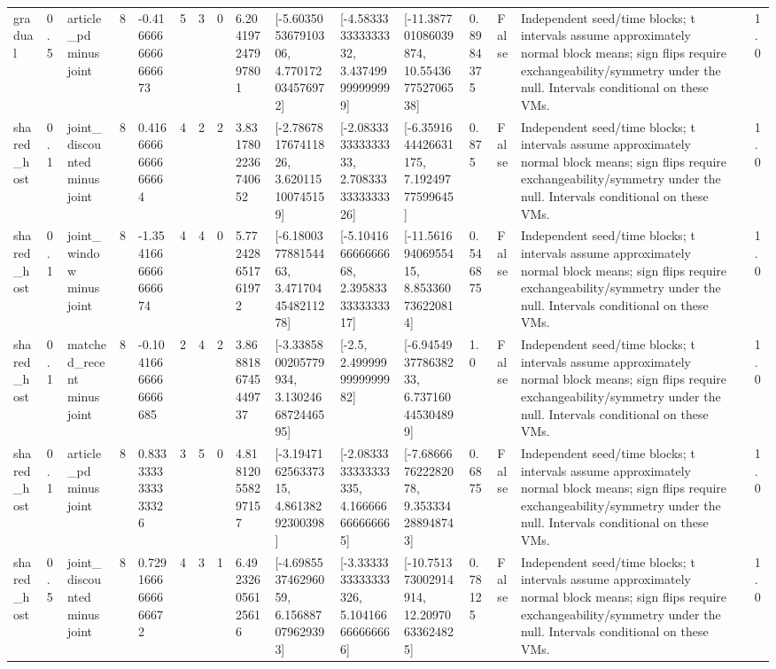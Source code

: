 \begin{tabular}{lllllllllllllllll}
gradual & 0.5 & article\_pd minus joint & 8 & -0.4166666666666673 & 5 & 3 & 0 & 6.204197247997801 & [-5.603505367910306, 4.770172034576972] & [-4.583333333333332, 3.437499999999999] & [-11.387701086039874, 10.554367752706538] & 0.8984375 & False & Independent seed/time blocks; t intervals assume approximately normal block means; sign flips require exchangeability/symmetry under the null. Intervals conditional on these VMs. &  & 1.0 \\
shared\_host & 0.1 & joint\_discounted minus joint & 8 & 0.4166666666666664 & 4 & 2 & 2 & 3.8317802236740652 & [-2.786781767411826, 3.620115100745159] & [-2.083333333333333, 2.7083333333333326] & [-6.3591644426631175, 7.19249777599645] & 0.875 & False & Independent seed/time blocks; t intervals assume approximately normal block means; sign flips require exchangeability/symmetry under the null. Intervals conditional on these VMs. &  & 1.0 \\
shared\_host & 0.1 & joint\_window minus joint & 8 & -1.3541666666666674 & 4 & 4 & 0 & 5.772428651761972 & [-6.180037788154463, 3.4717044548211278] & [-5.104166666666668, 2.3958333333333317] & [-11.56169406955415, 8.853360736220814] & 0.546875 & False & Independent seed/time blocks; t intervals assume approximately normal block means; sign flips require exchangeability/symmetry under the null. Intervals conditional on these VMs. &  & 1.0 \\
shared\_host & 0.1 & matched\_recent minus joint & 8 & -0.10416666666666685 & 2 & 4 & 2 & 3.8688186745449737 & [-3.3385800205779934, 3.1302466872446595] & [-2.5, 2.4999999999999982] & [-6.945493778638233, 6.737160445304899] & 1.0 & False & Independent seed/time blocks; t intervals assume approximately normal block means; sign flips require exchangeability/symmetry under the null. Intervals conditional on these VMs. &  & 1.0 \\
shared\_host & 0.1 & article\_pd minus joint & 8 & 0.8333333333333326 & 3 & 5 & 0 & 4.818120558297157 & [-3.194716256337315, 4.86138292300398] & [-2.0833333333333335, 4.166666666666665] & [-7.686667622282078, 9.353334288948743] & 0.6875 & False & Independent seed/time blocks; t intervals assume approximately normal block means; sign flips require exchangeability/symmetry under the null. Intervals conditional on these VMs. &  & 1.0 \\
shared\_host & 0.5 & joint\_discounted minus joint & 8 & 0.7291666666666672 & 4 & 3 & 1 & 6.492326056125616 & [-4.698553746296059, 6.156887079629393] & [-3.3333333333333326, 5.104166666666666] & [-10.751373002914914, 12.20970633624825] & 0.78125 & False & Independent seed/time blocks; t intervals assume approximately normal block means; sign flips require exchangeability/symmetry under the null. Intervals conditional on these VMs. &  & 1.0 \\

\end{tabular}
